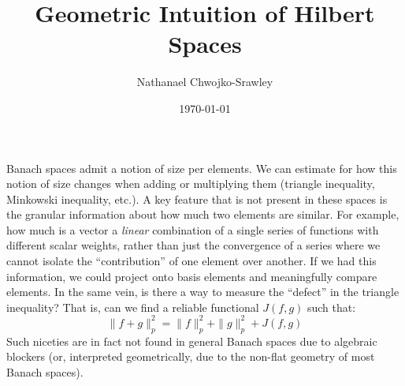 \documentclass{article}
\title{Geometric Intuition of Hilbert Spaces}
\author{Nathanael Chwojko-Srawley}
\date{\today}
\renewcommand{\maketitle}{
    \quad
    \vspace{1em}
  \begin{center}
      \LARGE\bfseries \thetitle \par
      \vspace{0.6em}
      \large
  \end{center}
    \vspace{1em}
}
\begin{document}
\maketitle

Banach spaces admit a notion of size per elements. We can estimate for how
this notion of size changes when adding or multiplying them (triangle inequality, Minkowski inequality, etc.). A key
feature that is not present in these spaces is the granular information about how much two elements are similar. For
example, how much is a vector a \emph{linear} combination of a single series of functions with different
scalar weights, rather than just the convergence of a series where we cannot isolate the ``contribution'' of
one element over another. If we had this information, we could project onto basis elements and meaningfully
compare elements. In the same vein, is there a way to measure the ``defect'' in the triangle
inequality? That is, can we find a reliable functional $J(f,g)$ such that:
\[
	\|f+g\|_p^2 = \|f\|_p^2 + \|g\|_p^2 + J(f,g)
\]
Such niceties are in fact not found in general Banach spaces due to algebraic blockers (or, interpreted
geometrically, due to the non-flat geometry of most Banach spaces).
\end{document}
